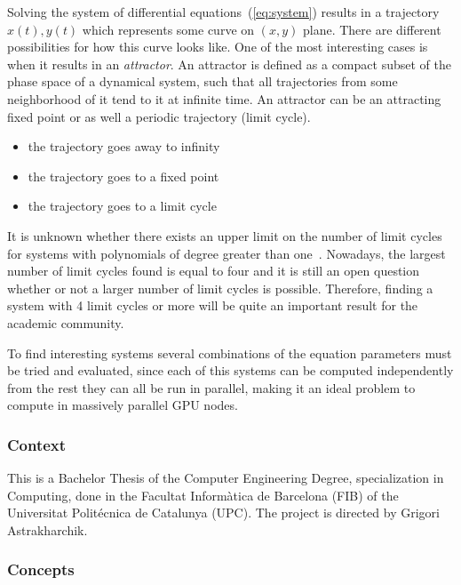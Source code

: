 Solving the system of differential equations~(\ref{eq:system}) results in a trajectory $x(t), y(t)$ which represents some curve on $(x,y)$ plane. There are different possibilities for how this curve looks like. One of the most interesting cases is when it results in an {\it attractor}. An attractor is defined as a compact subset of the phase space of a dynamical system, such that all trajectories from some neighborhood of it tend to it at infinite time. An attractor can be an attracting fixed point or as well a periodic trajectory (limit cycle).

\begin{itemize}
\item the trajectory goes away to infinity
\item the trajectory goes to a fixed point
\item the trajectory goes to a limit cycle
\end{itemize}

It is unknown whether there exists an upper limit on the number of limit cycles
for systems with polynomials of degree greater than
one~\cite{christopher_hilberts_2007,ilyashenko_centennial_2002,llibre_sobre_2015}.
Nowadays, the largest number of limit cycles found is equal to four and it is
still an open question whether or not a larger number of limit cycles is
possible. Therefore, finding a system with 4 limit cycles or more will be quite
an important result for the academic community.

To find interesting systems several combinations of the equation parameters
must be tried and evaluated, since each of this systems can be computed
independently from the rest they can all be run in parallel, making it an ideal
problem to compute in massively parallel GPU nodes.

\subsubsection{Context}

This is a Bachelor Thesis of the Computer Engineering Degree, specialization in
Computing, done in the \textcatalan{Facultat Inform\`atica de Barcelona (FIB)}
of the \textcatalan{Universitat Polit\'ecnica de Catalunya (UPC)}. The project
is directed by Grigori Astrakharchik.

\subsubsection{Concepts}

